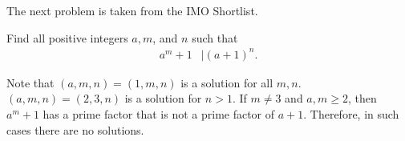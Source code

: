 \documentclass{subfile}
\begin{document}
			The next problem is taken from the IMO Shortlist.
		\begin{problem}
			Find all positive integers $a,m$, and $n$ such that 
				\begin{align*}
					a^m+1 & |(a+1)^n.
				\end{align*}
		\end{problem}
		
		\begin{solution}
			Note that $(a,m,n)=(1,m,n)$ is a solution for all $m,n$. $(a,m,n)=(2,3,n)$ is a solution for $n>1$. If $m\neq3$ and $a,m\geq2$, then $a^m+1$ has a prime factor that is not a prime factor of $a+1$. Therefore, in such cases there are no solutions.
		\end{solution}
		
\end{document}
